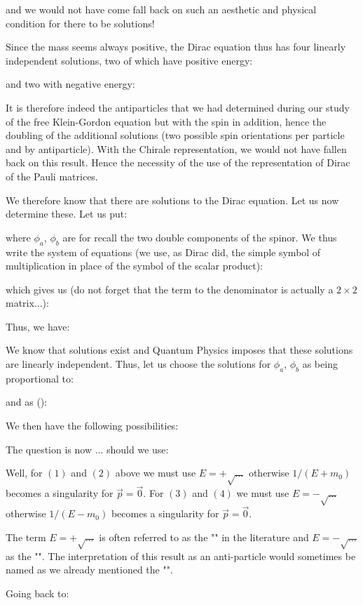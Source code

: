 	and we would not have come fall back on such an aesthetic and physical condition for there to be solutions!

Since the mass seems always positive, the Dirac equation thus has four linearly independent solutions, two of which have positive energy:
	
	and two with negative energy:
	
	It is therefore indeed the antiparticles that we had determined during our study of the free Klein-Gordon equation but with the spin in addition, hence the doubling of the additional solutions (two possible spin orientations per particle and by antiparticle). With the Chirale representation, we would not have fallen back on this result. Hence the necessity of the use of the representation of Dirac of the Pauli matrices.

We therefore know that there are solutions to the Dirac equation. Let us now determine these. Let us put:
	
	where $\phi_a$, $\phi_b$ are for recall the two double components of the spinor. We thus write the system of equations (we use, as Dirac did, the simple symbol of multiplication in place of the symbol of the scalar product):
	
	which gives us (do not forget that the term to the denominator is actually a $2\times 2$ matrix...):
	
	Thus, we have:
	
	We know that solutions exist and Quantum Physics imposes that these solutions are linearly independent. Thus, let us choose the solutions for $\phi_a$, $\phi_b$ as being proportional to:
	
	and as ():
	
	We then have the following possibilities:
	
	The question is now ... should we use:
 	
	Well, for $(1)$ and $(2)$ above we must use $E=+\sqrt{\ldots}$ otherwise $1/(E+m_0)$ becomes a singularity for $\vec{p}=\vec{0}$. For $(3)$ and $(4)$ we must use $E=-\sqrt{\ldots}$ otherwise $1/(E-m_0)$ becomes a singularity for $\vec{p}=\vec{0}$.
	\begin{tcolorbox}[title=Remark,colframe=black,arc=10pt]
	The term $E=+\sqrt{\ldots}$ is often referred to as the "" in the literature and $E=-\sqrt{\ldots}$ as the "". The interpretation of this result as an anti-particle would sometimes be named as we already mentioned the "".
	\end{tcolorbox}
	Going back to:
	
